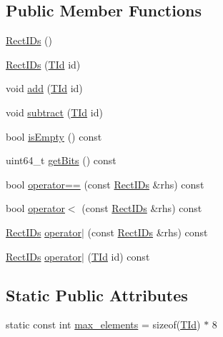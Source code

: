 \subsection*{Public Member Functions}
\begin{DoxyCompactItemize}
\item 
\mbox{\hyperlink{structhwcomposer_1_1RectIDs_a8082a18e364f9e423d5e0cfdd0b98256}{Rect\+I\+Ds}} ()
\item 
\mbox{\hyperlink{structhwcomposer_1_1RectIDs_a853d6cc2eb770859639cef103624c5ab}{Rect\+I\+Ds}} (\mbox{\hyperlink{structhwcomposer_1_1RectIDs_a53423437c946ca00a75cde5c4d199c6f}{T\+Id}} id)
\item 
void \mbox{\hyperlink{structhwcomposer_1_1RectIDs_af08fe3995861f43068004aa2808bad90}{add}} (\mbox{\hyperlink{structhwcomposer_1_1RectIDs_a53423437c946ca00a75cde5c4d199c6f}{T\+Id}} id)
\item 
void \mbox{\hyperlink{structhwcomposer_1_1RectIDs_ac7519387ade04527f751636f7964ae40}{subtract}} (\mbox{\hyperlink{structhwcomposer_1_1RectIDs_a53423437c946ca00a75cde5c4d199c6f}{T\+Id}} id)
\item 
bool \mbox{\hyperlink{structhwcomposer_1_1RectIDs_ac28f3d87424ac65cabb08a5fba379581}{is\+Empty}} () const
\item 
uint64\+\_\+t \mbox{\hyperlink{structhwcomposer_1_1RectIDs_a67b104d47b752031f3a9c568ef2fdd4b}{get\+Bits}} () const
\item 
bool \mbox{\hyperlink{structhwcomposer_1_1RectIDs_af15bc137ae87e79d042fa048601c09eb}{operator==}} (const \mbox{\hyperlink{structhwcomposer_1_1RectIDs}{Rect\+I\+Ds}} \&rhs) const
\item 
bool \mbox{\hyperlink{structhwcomposer_1_1RectIDs_a65b50d48c84aeb3b6cd21488c839d300}{operator$<$}} (const \mbox{\hyperlink{structhwcomposer_1_1RectIDs}{Rect\+I\+Ds}} \&rhs) const
\item 
\mbox{\hyperlink{structhwcomposer_1_1RectIDs}{Rect\+I\+Ds}} \mbox{\hyperlink{structhwcomposer_1_1RectIDs_ab8d5f3b215bb0b2cc9ec2cb69394efd8}{operator$\vert$}} (const \mbox{\hyperlink{structhwcomposer_1_1RectIDs}{Rect\+I\+Ds}} \&rhs) const
\item 
\mbox{\hyperlink{structhwcomposer_1_1RectIDs}{Rect\+I\+Ds}} \mbox{\hyperlink{structhwcomposer_1_1RectIDs_ab342c66b084d0df2dbf600ecd1bc1ddd}{operator$\vert$}} (\mbox{\hyperlink{structhwcomposer_1_1RectIDs_a53423437c946ca00a75cde5c4d199c6f}{T\+Id}} id) const
\end{DoxyCompactItemize}
\subsection*{Static Public Attributes}
\begin{DoxyCompactItemize}
\item 
static const int \mbox{\hyperlink{structhwcomposer_1_1RectIDs_a6e63ef88d763764bda7fa4eca542ad54}{max\+\_\+elements}} = sizeof(\mbox{\hyperlink{structhwcomposer_1_1RectIDs_a53423437c946ca00a75cde5c4d199c6f}{T\+Id}}) $\ast$ 8
\end{DoxyCompactItemize}


